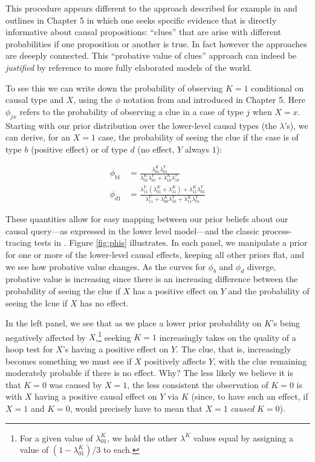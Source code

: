 \documentclass[12pt,]{book}
\let\rmarkdownfootnote\footnote%
\def\footnote{\protect\rmarkdownfootnote}
\begin{document}
This procedure appears different to the approach described for example in \citet{collier2004sources} and outlines in Chapter 5 in which one seeks specific evidence that is directly informative about causal propositions: ``clues'' that are arise with different probabilities if one proposition or another is true. In fact however the approaches are deeeply connected. This ``probative value of clues'' approach can indeed be \emph{justified} by reference to more fully elaborated models of the world.

To see this we can write down the probability of observing \(K=1\) conditional on causal type and \(X\), using the \(\phi\) notation from \citet{humphreys2015mixing} and introduced in Chapter 5. Here \(\phi_{jx}\) refers to the probability of observing a clue in a case of type \(j\) when \(X=x\). Starting with our prior distribution over the lower-level causal types (the \(\lambda\)'s), we can derive, for an \(X=1\) case, the probability of seeing the clue if the case is of type \(b\) (positive effect) or of type \(d\) (no effect, \(Y\) always \(1\)):

\begin{equation}
\begin{split}
\phi_{b1} & = \frac{\lambda_{01}^{K}\lambda_{01}^{Y}}{\lambda_{01}^{K}\lambda_{01}^{Y}+\lambda_{10}^{K}\lambda_{10}^{Y}}\\ 
\phi_{d1} & = \frac{\lambda_{11}^{Y}(\lambda_{01}^{K}+\lambda_{11}^{K})+\lambda_{11}^{K}\lambda_{01}^{Y}}{\lambda_{11}^{Y} + \lambda_{00}^{K}\lambda_{10}^{Y} + \lambda_{11}^{K}\lambda_{01}^{Y}}
\end{split}
\label{eq:phisfromlambdas}
\end{equation}

These quantities allow for easy mapping between our prior beliefs about our causal query---as expressed in the lower level model---and the classic process-tracing tests in \citet{Van-Evera:1997}. Figure \ref{fig:phis} illustrates. In each panel, we manipulate a prior for one or more of the lower-level causal effects, keeping all other priors flat, and we see how probative value changes. As the curves for \(\phi_b\) and \(\phi_d\) diverge, probative value is increasing since there is an increasing difference between the probability of seeing the clue if \(X\) has a positive effect on \(Y\) and the probability of seeing the lcue if \(X\) has no effect.

In the left panel, we see that as we place a lower prior probability on \(K\)'s being negatively affected by \(X\),\footnote{For a given value of \(\lambda^K_{01}\), we hold the other \(\lambda^K\) values equal by assigning a value of \((1-\lambda^K_{01})/3\) to each.} seeking \(K=1\) increasingly takes on the quality of a hoop test for \(X\)'s having a positive effect on \(Y\). The clue, that is, increasingly becomes something we must see if \(X\) positively affects \(Y\), with the clue remaining moderately probable if there is no effect. Why? The less likely we believe it is that \(K=0\) was caused by \(X=1\), the less consistent the observation of \(K=0\) is with \(X\) having a positive causal effect on \(Y\) via \(K\) (since, to have such an effect, if \(X=1\) and \(K=0\), would precisely have to mean that \(X=1\) \emph{caused} \(K=0\)).
\end{document}
